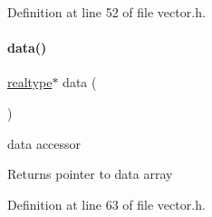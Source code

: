 Definition at line 52 of file vector.\+h.

\mbox{\label{classamici_1_1_ami_vector_aee17a5447b8e03180f89a2a8acbd572f}} 
\paragraph{\texorpdfstring{data()}{data()}\hspace{0.1cm}{\footnotesize\ttfamily [1/2]}}
{\footnotesize\ttfamily \mbox{\hyperlink{namespaceamici_a1bdce28051d6a53868f7ccbf5f2c14a3}{realtype}}$\ast$ data (\begin{DoxyParamCaption}{ }\end{DoxyParamCaption})}

data accessor \begin{DoxyReturn}{Returns}
pointer to data array 
\end{DoxyReturn}


Definition at line 63 of file vector.\+h.

